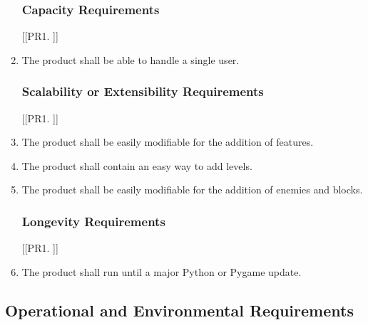 \documentclass[12pt, titlepage]{article}
\begin{document}
\begin{enumerate}[{PR}1. ]
\subsubsection{Capacity Requirements}
[{[{PR}1. ]}]
    \item The product shall be able to handle a single user.

\subsubsection{Scalability or Extensibility Requirements}
[{[{PR}1. ]}]
    \item The product shall be easily modifiable for the addition of features.
    \item The product shall contain an easy way to add levels.
    \item The product shall be easily modifiable for the addition of enemies and blocks.

\subsubsection{Longevity Requirements}
[{[{PR}1. ]}]
    \item The product shall run until a major Python or Pygame update.
\end{enumerate}



\subsection{Operational and Environmental Requirements}
\end{document}
